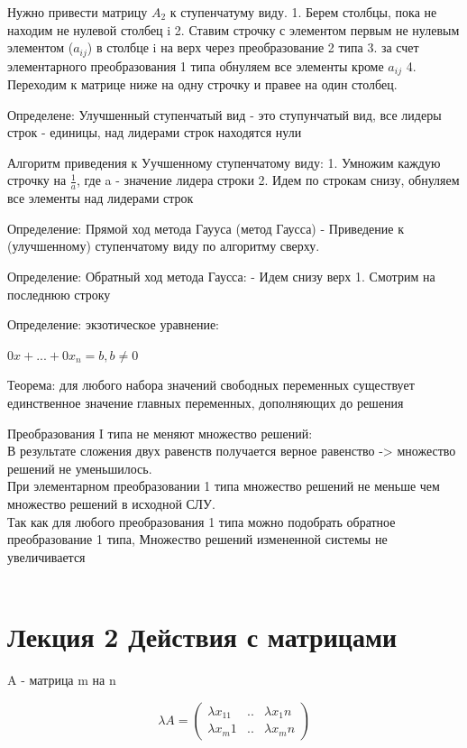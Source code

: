 \documentclass[a4paper]{article}
\begin{document}
Нужно привести матрицу $A_2$  к ступенчатуму виду.
1. Берем столбцы, пока не находим не нулевой столбец i
2. Ставим строчку с элементом первым не нулевым элементом ($a_{ij}$) в столбце i на верх через преобразование 2 типа
3. за счет элементарного преобразования 1 типа обнуляем все элементы кроме $a_{ij}$
4. Переходим к матрице ниже на одну строчку и правее на один столбец.

Определене: Улучшенный ступенчатый вид - это ступунчатый вид, все лидеры строк - единицы, над лидерами строк находятся нули

Алгоритм приведения к Уучшенному ступенчатому виду:
1. Умножим каждую строчку на $\frac{1}{a}$, где a - значение лидера строки
2. Идем по строкам снизу, обнуляем все элементы над лидерами строк

Определение: Прямой ход метода Гаууса (метод Гаусса)  - Приведение к (улучшенному) ступенчатому виду по алгоритму сверху.

Определение: Обратный ход метода Гаусса:
- Идем снизу верх
1. Смотрим на последнюю строку



Определение: экзотическое уравнение:

$0x +...+ 0x_{n}=  b, b \neq 0$



Теорема: для любого набора значений свободных переменных существует единственное значение главных переменных, дополняющих до решения




Преобразования I типа не меняют множество решений:\\
В результате сложения двух равенств получается верное равенство -> множество решений не уменьшилось.
\\При элементарном преобразовании 1 типа множество решений не меньше чем множество решений в исходной СЛУ.\\
Так как для любого преобразования 1 типа можно подобрать обратное преобразование 1 типа, Множество решений измененной системы не увеличивается
\\
\\

\section{Лекция 2 Действия с матрицами}


A - матрица m на n


\begin{equation*}
\lambda A =  
\begin{pmatrix}
  \lambda x_11 & .. & \lambda x_1n\\
    \lambda x_m1& ..& \lambda x_mn
\end{pmatrix}
\end{equation*}
\end{document}
